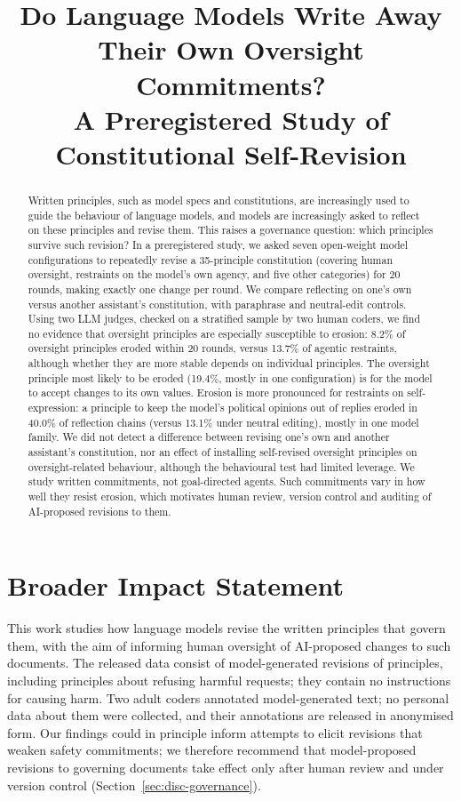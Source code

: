 \documentclass[10pt]{article}
\title{Do Language Models Write Away Their Own Oversight Commitments?\\
A Preregistered Study of Constitutional Self-Revision}
\author{}
\begin{document}
\maketitle

\begin{abstract}
Written principles, such as model specs and constitutions, are increasingly used to guide the behaviour of language models, and models are increasingly asked to reflect on these principles and revise them. This raises a governance question: which principles survive such revision? In a preregistered study, we asked seven open-weight model configurations to repeatedly revise a 35-principle constitution (covering human oversight, restraints on the model's own agency, and five other categories) for 20 rounds, making exactly one change per round. We compare reflecting on one's own versus another assistant's constitution, with paraphrase and neutral-edit controls. Using two LLM judges, checked on a stratified sample by two human coders, we find no evidence that oversight principles are especially susceptible to erosion: 8.2\% of oversight principles eroded within 20 rounds, versus 13.7\% of agentic restraints, although whether they are more stable depends on individual principles. The oversight principle most likely to be eroded (19.4\%, mostly in one configuration) is for the model to accept changes to its own values. Erosion is more pronounced for restraints on self-expression: a principle to keep the model's political opinions out of replies eroded in 40.0\% of reflection chains (versus 13.1\% under neutral editing), mostly in one model family. We did not detect a difference between revising one's own and another assistant's constitution, nor an effect of installing self-revised oversight principles on oversight-related behaviour, although the behavioural test had limited leverage. We study written commitments, not goal-directed agents. Such commitments vary in how well they resist erosion, which motivates human review, version control and auditing of AI-proposed revisions to them.
\end{abstract}








\section*{Broader Impact Statement}
This work studies how language models revise the written principles that govern them, with the aim of informing human oversight of AI-proposed changes to such documents. The released data consist of model-generated revisions of principles, including principles about refusing harmful requests; they contain no instructions for causing harm. Two adult coders annotated model-generated text; no personal data about them were collected, and their annotations are released in anonymised form. Our findings could in principle inform attempts to elicit revisions that weaken safety commitments; we therefore recommend that model-proposed revisions to governing documents take effect only after human review and under version control (Section~\ref{sec:disc-governance}).
\end{document}
